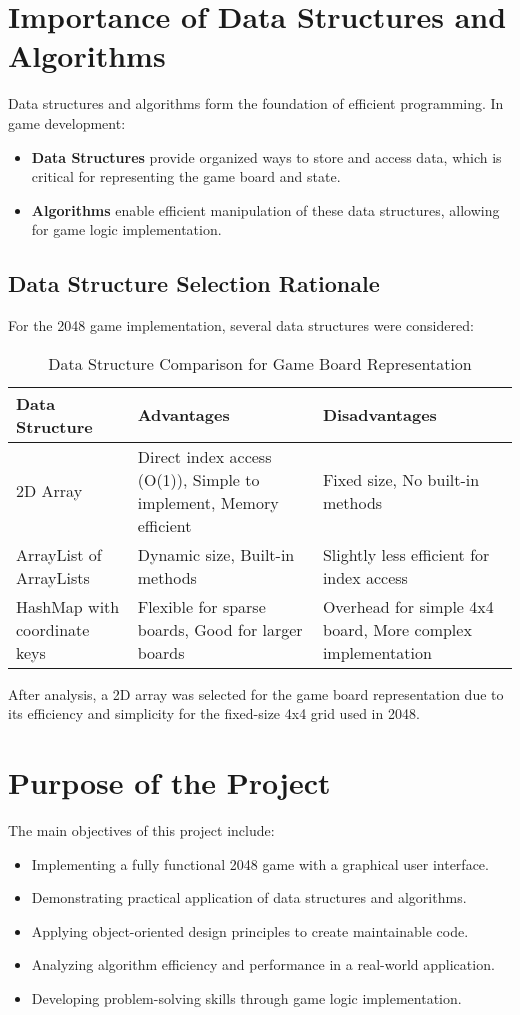 \documentclass[12pt, a4paper]{article}
\begin{document}
\section{Importance of Data Structures and Algorithms}
Data structures and algorithms form the foundation of efficient programming. In game development:

\begin{itemize}
    \item \textbf{Data Structures} provide organized ways to store and access data, which is critical for representing the game board and state.
    \item \textbf{Algorithms} enable efficient manipulation of these data structures, allowing for game logic implementation.
\end{itemize}

\subsection{Data Structure Selection Rationale}
For the 2048 game implementation, several data structures were considered:

\begin{table}[h]
\centering
\caption{Data Structure Comparison for Game Board Representation}
\begin{tabular}{|l|p{5cm}|p{5cm}|}
\hline
\textbf{Data Structure} & \textbf{Advantages} & \textbf{Disadvantages} \\
\hline
2D Array & Direct index access (O(1)), Simple to implement, Memory efficient & Fixed size, No built-in methods \\
\hline
ArrayList of ArrayLists & Dynamic size, Built-in methods & Slightly less efficient for index access \\
\hline
HashMap with coordinate keys & Flexible for sparse boards, Good for larger boards & Overhead for simple 4x4 board, More complex implementation \\
\hline
\end{tabular}
\end{table}

After analysis, a 2D array was selected for the game board representation due to its efficiency and simplicity for the fixed-size 4x4 grid used in 2048.

\section{Purpose of the Project}
The main objectives of this project include:
\begin{itemize}
    \item Implementing a fully functional 2048 game with a graphical user interface.
    \item Demonstrating practical application of data structures and algorithms.
    \item Applying object-oriented design principles to create maintainable code.
    \item Analyzing algorithm efficiency and performance in a real-world application.
    \item Developing problem-solving skills through game logic implementation.
\end{itemize}
\end{document}
